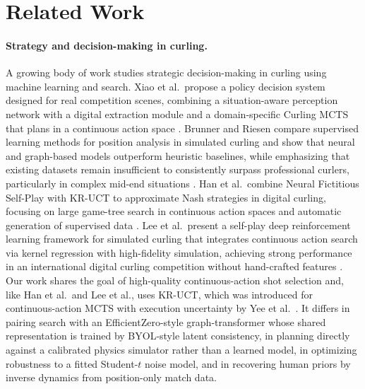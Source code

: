 \documentclass[11pt]{article}
\begin{document}
\section{Related Work}

\paragraph{Strategy and decision-making in curling.}
A growing body of work studies strategic decision-making in curling using
machine learning and search. Xiao et al.\ propose a policy decision system
designed for real competition scenes, combining a situation-aware perception
network with a digital extraction module and a domain-specific Curling MCTS
that plans in a continuous action space \cite{xiao2023policy}. Brunner and
Riesen compare supervised learning methods for position analysis in
simulated curling and show that neural and graph-based models outperform
heuristic baselines, while emphasizing that existing datasets remain
insufficient to consistently surpass professional curlers, particularly in
complex mid-end situations \cite{brunner2024comparing}. Han et al.\ combine
Neural Fictitious Self-Play with KR-UCT to approximate Nash strategies in
digital curling, focusing on large game-tree search in continuous action
spaces and automatic generation of supervised data \cite{han2022game}. Lee
et al.\ present a self-play deep reinforcement learning framework for
simulated curling that integrates continuous action search via kernel
regression with high-fidelity simulation, achieving strong performance in
an international digital curling competition without hand-crafted features
\cite{lee2018deep}. Our work shares the goal of high-quality continuous-action
shot selection and, like Han et al.\ and Lee et al., uses KR-UCT, which was
introduced for continuous-action MCTS with execution uncertainty by Yee
et al.~\cite{yee2016monte}. It differs in pairing search with an
EfficientZero-style graph-transformer whose shared representation is trained
by BYOL-style latent consistency, in planning directly against a calibrated
physics simulator rather than a learned model, in optimizing robustness to a
fitted Student-$t$ noise model, and in recovering human priors by inverse
dynamics from position-only match data.
\end{document}
